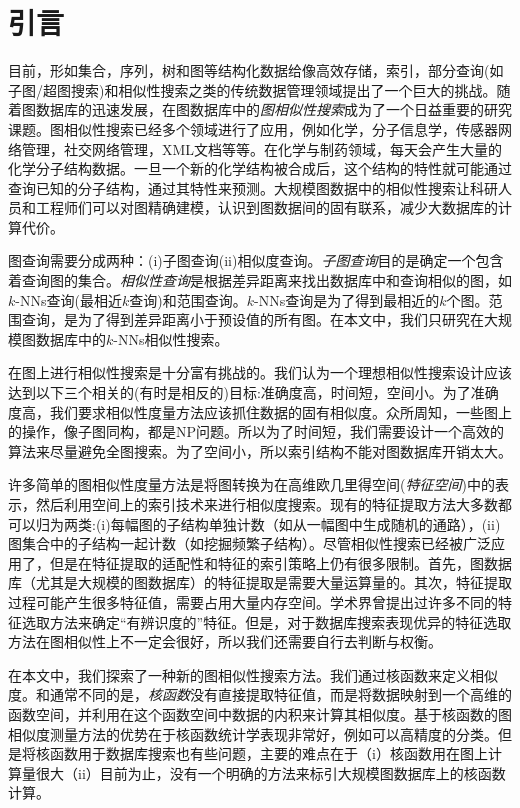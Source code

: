 \documentclass{article}
\begin{document}
\else

\fi
\chapter{引言}
目前，形如集合，序列，树和图等结构化数据给像高效存储，索引，部分查询(如子图/超图搜索)和相似性搜索之类的传统数据管理领域提出了一个巨大的挑战。随着图数据库的迅速发展，在图数据库中的\emph{图相似性搜索}成为了一个日益重要的研究课题。图相似性搜索已经多个领域进行了应用，例如化学，分子信息学，传感器网络管理，社交网络管理，XML文档等等。在化学与制药领域，每天会产生大量的化学分子结构数据。一旦一个新的化学结构被合成后，这个结构的特性就可能通过查询已知的分子结构，通过其特性来预测。大规模图数据中的相似性搜索让科研人员和工程师们可以对图精确建模，认识到图数据间的固有联系，减少大数据库的计算代价。

图查询需要分成两种：(i)子图查询(ii)相似度查询。\emph{子图查询}目的是确定一个包含着查询图的集合。\emph{相似性查询}是根据差异距离来找出数据库中和查询相似的图，如$k$-NNs查询(最相近$k$查询)和范围查询。$k$-NNs查询是为了得到最相近的$k$个图。范围查询，是为了得到差异距离小于预设值的所有图。在本文中，我们只研究在大规模图数据库中的$k$-NNs相似性搜索。

在图上进行相似性搜索是十分富有挑战的。我们认为一个理想相似性搜索设计应该达到以下三个相关的(有时是相反的)目标:准确度高，时间短，空间小。为了准确度高，我们要求相似性度量方法应该抓住数据的固有相似度。众所周知，一些图上的操作，像子图同构，都是NP问题。所以为了时间短，我们需要设计一个高效的算法来尽量避免全图搜索。为了空间小，所以索引结构不能对图数据库开销太大。

许多简单的图相似性度量方法是将图转换为在高维欧几里得空间(\emph{特征空间})中的表示，然后利用空间上的索引技术来进行相似度搜索。现有的特征提取方法大多数都可以归为两类:(i)每幅图的子结构单独计数（如从一幅图中生成随机的通路），(ii)图集合中的子结构一起计数（如挖掘频繁子结构）。尽管相似性搜索已经被广泛应用了，但是在特征提取的适配性和特征的索引策略上仍有很多限制。首先，图数据库（尤其是大规模的图数据库）的特征提取是需要大量运算量的。其次，特征提取过程可能产生很多特征值，需要占用大量内存空间。学术界曾提出过许多不同的特征选取方法来确定“有辨识度的”特征。但是，对于数据库搜索表现优异的特征选取方法在图相似性上不一定会很好，所以我们还需要自行去判断与权衡。

在本文中，我们探索了一种新的图相似性搜索方法。我们通过核函数来定义相似度。和通常不同的是，\emph{核函数}没有直接提取特征值，而是将数据映射到一个高维的函数空间，并利用在这个函数空间中数据的内积来计算其相似度。基于核函数的图相似度测量方法的优势在于核函数统计学表现非常好，例如可以高精度的分类。但是将核函数用于数据库搜索也有些问题，主要的难点在于（i）核函数用在图上计算量很大（ii）目前为止，没有一个明确的方法来标引大规模图数据库上的核函数计算。
\end{document}
